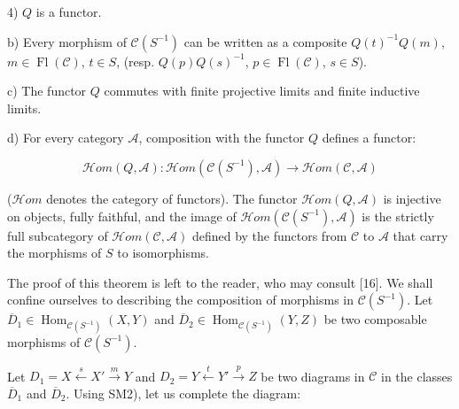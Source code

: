 \par\noindent\hspace*{2em}4) $Q$ is a functor.

\par\noindent b) Every morphism of $\mathcal C(S^{-1})$ can be written as a
composite $Q(t)^{-1}Q(m)$, $m\in\operatorname{Fl}(\mathcal C)$, $t\in S$,
(resp. $Q(p)Q(s)^{-1}$, $p\in\operatorname{Fl}(\mathcal C)$, $s\in S$).

\par\noindent c) The functor $Q$ commutes with finite projective limits and
finite inductive limits.

\par\noindent d) For every category $\mathcal A$, composition with the
functor $Q$ defines a functor:

\[
  \mathcal{H}\!om(Q,\mathcal A)\colon
  \mathcal{H}\!om(\mathcal C(S^{-1}),\mathcal A)
  \longrightarrow \mathcal{H}\!om(\mathcal C,\mathcal A)
\]

\noindent\textup{($\mathcal{H}\!om$ denotes the category of functors).}
%
The functor $\mathcal{H}\!om(Q,\mathcal A)$ is injective on objects, fully
faithful, and the image of
$\mathcal{H}\!om(\mathcal C(S^{-1}),\mathcal A)$ is the strictly full
subcategory of $\mathcal{H}\!om(\mathcal C,\mathcal A)$ defined by the functors from
$\mathcal C$ to $\mathcal A$ that carry the morphisms of $S$ to
isomorphisms.
\par\endgroup

The proof of this theorem is left to the reader, who may consult [16].
%
We shall confine ourselves to describing the composition of morphisms in
$\mathcal C(S^{-1})$. Let
$\overline D_1\in\operatorname{Hom}_{\mathcal C(S^{-1})}(X,Y)$ and
$\overline D_2\in\operatorname{Hom}_{\mathcal C(S^{-1})}(Y,Z)$ be two
composable morphisms of $\mathcal C(S^{-1})$.

Let $D_1=X\xleftarrow{s}X'\xrightarrow{m}Y$ and
$D_2=Y\xleftarrow{t}Y'\xrightarrow{p}Z$ be two diagrams in $\mathcal C$
in the classes $\overline D_1$ and $\overline D_2$.
%
Using SM2), let us complete the diagram:

\begin{center}
\end{center}

\endgroup
